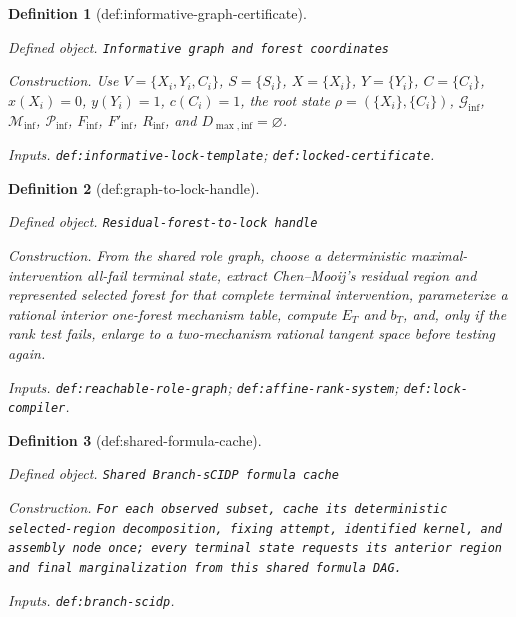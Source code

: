 \documentclass{article}
\newtheorem{definition}{Definition}
\begin{document}
\begin{definition}[def:informative-graph-certificate]\label{def:informative-graph-certificate}
\par\smallskip\noindent\emph{Defined object.} \texttt{Informative graph and forest coordinates}
\par\smallskip\noindent\emph{Construction.} Use \(V=\{X_i,Y_i,C_i\}\), \(S=\{S_i\}\), \(X=\{X_i\}\), \(Y=\{Y_i\}\), \(C=\{C_i\}\), \(x(X_i)=0\), \(y(Y_i)=1\), \(c(C_i)=1\), the root state \(\rho=(\{X_i\},\{C_i\})\), \(\mathcal G_{\mathrm{inf}}\), \(\mathcal M_{\mathrm{inf}}\), \(\mathcal P_{\mathrm{inf}}\), \(F_{\mathrm{inf}}\), \(F'_{\mathrm{inf}}\), \(R_{\mathrm{inf}}\), and \(D_{\max,\mathrm{inf}}=\varnothing\).
\par\smallskip\noindent\emph{Inputs.} \texttt{def:\allowbreak{}informative-\allowbreak{}lock-\allowbreak{}template}; \texttt{def:\allowbreak{}locked-\allowbreak{}certificate}.
\end{definition}

\begin{definition}[def:graph-to-lock-handle]\label{def:graph-to-lock-handle}
\par\smallskip\noindent\emph{Defined object.} \texttt{Residual-\allowbreak{}forest-\allowbreak{}to-\allowbreak{}lock handle}
\par\smallskip\noindent\emph{Construction.} From the shared role graph, choose a deterministic maximal-intervention all-fail terminal state, extract Chen--Mooij's residual region and represented selected forest for that complete terminal intervention, parameterize a rational interior one-forest mechanism table, compute \(E_T\) and \(b_T\), and, only if the rank test fails, enlarge to a two-mechanism rational tangent space before testing again.
\par\smallskip\noindent\emph{Inputs.} \texttt{def:\allowbreak{}reachable-\allowbreak{}role-\allowbreak{}graph}; \texttt{def:\allowbreak{}affine-\allowbreak{}rank-\allowbreak{}system}; \texttt{def:\allowbreak{}lock-\allowbreak{}compiler}.
\end{definition}

\begin{definition}[def:shared-formula-cache]\label{def:shared-formula-cache}
\par\smallskip\noindent\emph{Defined object.} \texttt{Shared Branch-\allowbreak{}sCIDP formula cache}
\par\smallskip\noindent\emph{Construction.} \texttt{For each observed subset,\allowbreak{} cache its deterministic selected-\allowbreak{}region decomposition,\allowbreak{} fixing attempt,\allowbreak{} identified kernel,\allowbreak{} and assembly node once;\allowbreak{} every terminal state requests its anterior region and final marginalization from this shared formula DAG.}
\par\smallskip\noindent\emph{Inputs.} \texttt{def:\allowbreak{}branch-\allowbreak{}scidp}.
\end{definition}
\end{document}

